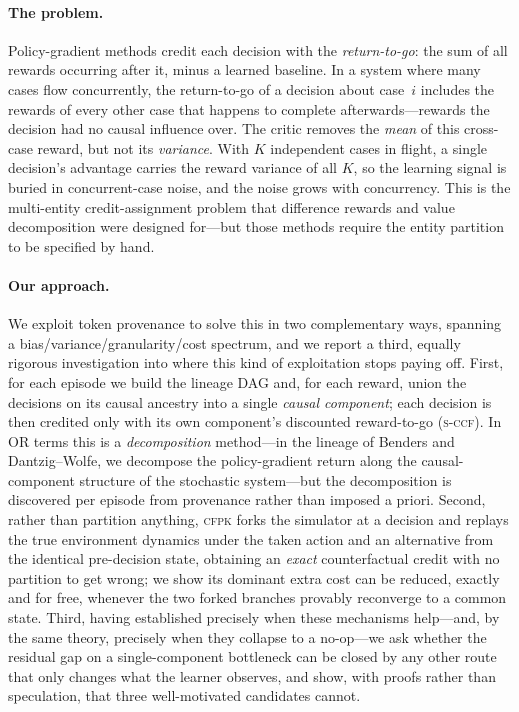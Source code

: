 \documentclass[review,authoryear,3p,times]{elsarticle}
\newcommand{\sccf}{\textsc{s-ccf}}
\newcommand{\cfpk}{\textsc{cfpk}}
\begin{document}
\paragraph{The problem.} Policy-gradient methods credit each decision with the
\emph{return-to-go}: the sum of all rewards occurring after it, minus a learned
baseline. In a system where many cases flow concurrently, the return-to-go of a
decision about case~$i$ includes the rewards of every other case that happens to
complete afterwards---rewards the decision had no causal influence over. The
critic removes the \emph{mean} of this cross-case reward, but not its
\emph{variance}. With $K$ independent cases in flight, a single decision's
advantage carries the reward variance of all $K$, so the learning signal is
buried in concurrent-case noise, and the noise grows with concurrency. This is
the multi-entity credit-assignment problem that difference rewards
\citep{difference2002} and value decomposition \citep{coma2018,vdn2018,qmix2018}
were designed for---but those methods require the entity partition to be
specified by hand.

\paragraph{Our approach.} We exploit token provenance to solve this in two
complementary ways, spanning a bias/variance/granularity/cost spectrum, and we
report a third, equally rigorous investigation into where this kind of
exploitation stops paying off. First, for each episode we build the lineage
DAG and, for each reward, union the decisions on its causal ancestry into a
single \emph{causal component}; each decision is then credited only with its
own component's discounted reward-to-go (\sccf). In OR terms this is a
\emph{decomposition} method---in the lineage of Benders and Dantzig--Wolfe, we
decompose the policy-gradient return along the causal-component structure of
the stochastic system---but the decomposition is discovered per episode from
provenance rather than imposed a priori. Second, rather than partition
anything, \cfpk{} forks the simulator at a decision and replays the true
environment dynamics under the taken action and an alternative from the
identical pre-decision state, obtaining an \emph{exact} counterfactual credit
with no partition to get wrong; we show its dominant extra cost can be
reduced, exactly and for free, whenever the two forked branches provably
reconverge to a common state. Third, having established precisely when these
mechanisms help---and, by the same theory, precisely when they collapse to a
no-op---we ask whether the residual gap on a single-component bottleneck can
be closed by any other route that only changes what the learner observes, and
show, with proofs rather than speculation, that three well-motivated
candidates cannot.
\end{document}
